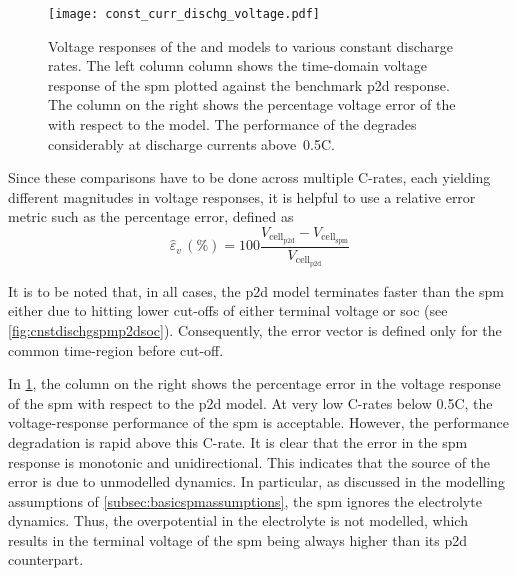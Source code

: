 \begin{figure}[!htbp]
    \centering
    \texttt{[image: const\_curr\_dischg\_voltage.pdf]}
    \caption[Voltage responses of  and  to
    constant current discharge]{Voltage responses of the  and
         models to various constant discharge rates. The left
        column column shows the time-domain voltage response of the \gls{spm}
        plotted against the benchmark \gls{p2d} response. The column on the
        right shows the percentage voltage error of the  with
        respect to the  model. The performance of the
         degrades considerably at discharge currents above~0.5C.}
    \label{fig:cnstdischgspmp2dvoltage}
\end{figure}

Since these comparisons  have to be done across multiple  C-rates, each yielding
different magnitudes in voltage responses, it is helpful to use a relative error
metric such as the percentage error, defined as
\begin{equation}
    \hat{\varepsilon}_v\,(\si{\percent}) = 100\frac{V_{\text{cell}_\text{p2d}} - V_{\text{cell}_\text{spm}}}{V_{\text{cell}_\text{p2d}}}
\end{equation}

It is to be noted that, in all cases, the \gls{p2d} model terminates faster than
the \gls{spm} either due to hitting lower cut-offs of either terminal voltage or
\gls{soc} (see \cref{fig:cnstdischgspmp2dsoc}).  Consequently, the  error vector
is defined only for the common time-region before cut-off.

In  \cref{fig:cnstdischgspmp2dvoltage},  the  column  on  the  right  shows  the
percentage error  in the voltage response  of the \gls{spm} with  respect to the
\gls{p2d} model.  At very  low C-rates  below \approx0.5C,  the voltage-response
performance of the \gls{spm} is acceptable. However, the performance degradation
is rapid above this C-rate. It is clear that the error in the \gls{spm} response
is monotonic and unidirectional. This indicates  that the source of the error is
due  to  unmodelled dynamics.  In  particular,  as  discussed in  the  modelling
assumptions  of  \cref{subsec:basicspmassumptions},  the \gls{spm}  ignores  the
electrolyte  dynamics.  Thus,  the  overpotential  in  the  electrolyte  is  not
modelled, which  results in the terminal  voltage of the \gls{spm}  being always
higher than its \gls{p2d} counterpart.

